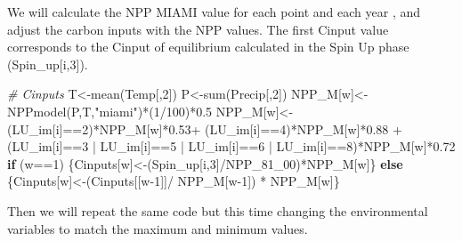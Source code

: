 \documentclass[
  10pt,
  b5paper,
]{book}
\newenvironment{Shaded}{\begin{snugshade}}{\end{snugshade}}
\newcommand{\CommentTok}[1]{\textcolor[rgb]{0.56,0.35,0.01}{\textit{#1}}}
\newcommand{\ControlFlowTok}[1]{\textcolor[rgb]{0.13,0.29,0.53}{\textbf{#1}}}
\newcommand{\DecValTok}[1]{\textcolor[rgb]{0.00,0.00,0.81}{#1}}
\newcommand{\FloatTok}[1]{\textcolor[rgb]{0.00,0.00,0.81}{#1}}
\newcommand{\FunctionTok}[1]{\textcolor[rgb]{0.00,0.00,0.00}{#1}}
\newcommand{\NormalTok}[1]{#1}
\newcommand{\OtherTok}[1]{\textcolor[rgb]{0.56,0.35,0.01}{#1}}
\newcommand{\SpecialCharTok}[1]{\textcolor[rgb]{0.00,0.00,0.00}{#1}}
\newcommand{\StringTok}[1]{\textcolor[rgb]{0.31,0.60,0.02}{#1}}
\begin{document}
We will calculate the NPP MIAMI value for each point and each year , and adjust the carbon inputs with the NPP values. The first Cinput value corresponds to the Cinput of equilibrium calculated in the Spin Up phase (Spin\_up{[}i,3{]}).

\begin{Shaded}
\begin{Highlighting}[]
\CommentTok{\# Cinputs }
\NormalTok{T}\OtherTok{\textless{}{-}}\FunctionTok{mean}\NormalTok{(Temp[,}\DecValTok{2}\NormalTok{])}
\NormalTok{P}\OtherTok{\textless{}{-}}\FunctionTok{sum}\NormalTok{(Precip[,}\DecValTok{2}\NormalTok{])}
\NormalTok{NPP\_M[w]}\OtherTok{\textless{}{-}}\FunctionTok{NPPmodel}\NormalTok{(P,T,}\StringTok{"miami"}\NormalTok{)}\SpecialCharTok{*}\NormalTok{(}\DecValTok{1}\SpecialCharTok{/}\DecValTok{100}\NormalTok{)}\SpecialCharTok{*}\FloatTok{0.5}
\NormalTok{NPP\_M[w]}\OtherTok{\textless{}{-}}\NormalTok{(LU\_im[i]}\SpecialCharTok{==}\DecValTok{2}\NormalTok{)}\SpecialCharTok{*}\NormalTok{NPP\_M[w]}\SpecialCharTok{*}\FloatTok{0.53}\SpecialCharTok{+}\NormalTok{ (LU\_im[i]}\SpecialCharTok{==}\DecValTok{4}\NormalTok{)}\SpecialCharTok{*}\NormalTok{NPP\_M[w]}\SpecialCharTok{*}\FloatTok{0.88} \SpecialCharTok{+}\NormalTok{ (LU\_im[i]}\SpecialCharTok{==}\DecValTok{3} \SpecialCharTok{|}\NormalTok{ LU\_im[i]}\SpecialCharTok{==}\DecValTok{5} \SpecialCharTok{|}\NormalTok{ LU\_im[i]}\SpecialCharTok{==}\DecValTok{6} \SpecialCharTok{|}\NormalTok{ LU\_im[i]}\SpecialCharTok{==}\DecValTok{8}\NormalTok{)}\SpecialCharTok{*}\NormalTok{NPP\_M[w]}\SpecialCharTok{*}\FloatTok{0.72}
\ControlFlowTok{if}\NormalTok{ (w}\SpecialCharTok{==}\DecValTok{1}\NormalTok{) \{Cinputs[w]}\OtherTok{\textless{}{-}}\NormalTok{(Spin\_up[i,}\DecValTok{3}\NormalTok{]}\SpecialCharTok{/}\NormalTok{NPP\_81\_00)}\SpecialCharTok{*}\NormalTok{NPP\_M[w]\} }\ControlFlowTok{else}\NormalTok{ \{Cinputs[w]}\OtherTok{\textless{}{-}}\NormalTok{(Cinputs[[w}\DecValTok{{-}1}\NormalTok{]]}\SpecialCharTok{/}\NormalTok{ NPP\_M[w}\DecValTok{{-}1}\NormalTok{]) }\SpecialCharTok{*}\NormalTok{ NPP\_M[w]\} }
\end{Highlighting}
\end{Shaded}

Then we will repeat the same code but this time changing the environmental variables to match the maximum and minimum values.
\end{document}
